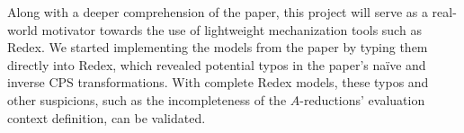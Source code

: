 \documentclass[11pt]{article}
\begin{document}
Along with a deeper comprehension of the paper, this project will serve as a real-world motivator towards the use of lightweight mechanization tools such as Redex.
We started implementing the models from the
paper by typing them directly into Redex, which revealed potential
typos in the paper's na\"{i}ve and inverse CPS transformations.
With complete Redex models, these typos and other suspicions, such as the incompleteness of the $A$-reductions' evaluation context definition, can be validated.
%



\pagebreak



\end{document}

